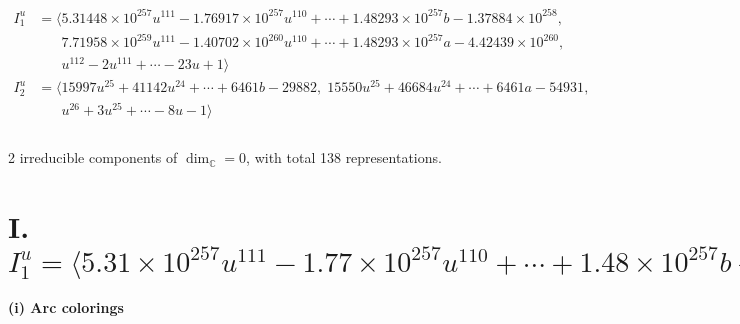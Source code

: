 \documentclass[1p]{elsarticle_modified}
\theoremstyle{definition}
\begin{document}
\begin{align*}
I^u_{1}&=\langle 
5.31448\times10^{257} u^{111}-1.76917\times10^{257} u^{110}+\cdots+1.48293\times10^{257} b-1.37884\times10^{258},\\
\phantom{I^u_{1}}&\phantom{= \langle  }7.71958\times10^{259} u^{111}-1.40702\times10^{260} u^{110}+\cdots+1.48293\times10^{257} a-4.42439\times10^{260},\\
\phantom{I^u_{1}}&\phantom{= \langle  }u^{112}-2 u^{111}+\cdots-23 u+1\rangle \\
I^u_{2}&=\langle 
15997 u^{25}+41142 u^{24}+\cdots+6461 b-29882,\;15550 u^{25}+46684 u^{24}+\cdots+6461 a-54931,\\
\phantom{I^u_{2}}&\phantom{= \langle  }u^{26}+3 u^{25}+\cdots-8 u-1\rangle \\
\\
\end{align*}
\raggedright * 2 irreducible components of $\dim_{\mathbb{C}}=0$, with total 138 representations.\\
\newpage
\renewcommand{\arraystretch}{1}
\centering \section*{I. $I^u_{1}= \langle 5.31\times10^{257} u^{111}-1.77\times10^{257} u^{110}+\cdots+1.48\times10^{257} b-1.38\times10^{258},\;7.72\times10^{259} u^{111}-1.41\times10^{260} u^{110}+\cdots+1.48\times10^{257} a-4.42\times10^{260},\;u^{112}-2 u^{111}+\cdots-23 u+1 \rangle$}
\flushleft \textbf{(i) Arc colorings}\\
\end{document}
